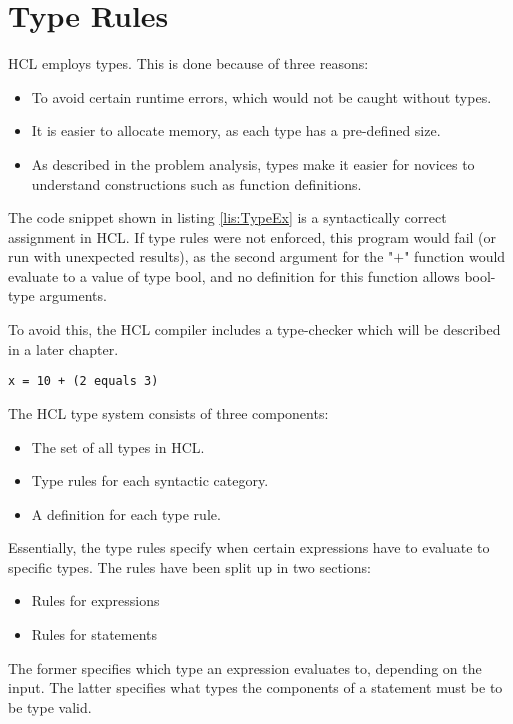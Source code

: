 \section{Type Rules}
HCL employs types.
This is done because of three reasons:
\begin{itemize}
	\item To avoid certain runtime errors, which would not be caught without types.
	\item It is easier to allocate memory, as each type has a pre-defined size.
	\item As described in the problem analysis, types make it easier for novices to understand constructions such as function definitions.
\end{itemize}
The code snippet shown in listing \ref{lis:TypeEx} is a syntactically correct assignment in HCL.
If type rules were not enforced, this program would fail (or run with unexpected results), as the second argument for the "$+$" function would evaluate to a value of type bool, and no definition for this function allows bool-type arguments.

To avoid this, the HCL compiler includes a type-checker which will be described in a later chapter.
\begin{lstlisting}[language=HCL,label=lis:TypeEx,caption=An HCL expression,firstnumber=9]
x = 10 + (2 equals 3)
\end{lstlisting}

The HCL type system consists of three components:
\begin{itemize}
	\item The set of all types in HCL.
	\item Type rules for each syntactic category.
	\item A definition for each type rule.
\end{itemize}

Essentially, the type rules specify when certain expressions have to evaluate to specific types.
The rules have been split up in two sections:
\begin{itemize}
	\item Rules for expressions
	\item Rules for statements
\end{itemize}
The former specifies which type an expression evaluates to, depending on the input.
The latter specifies what types the components of a statement must be to be type valid.

